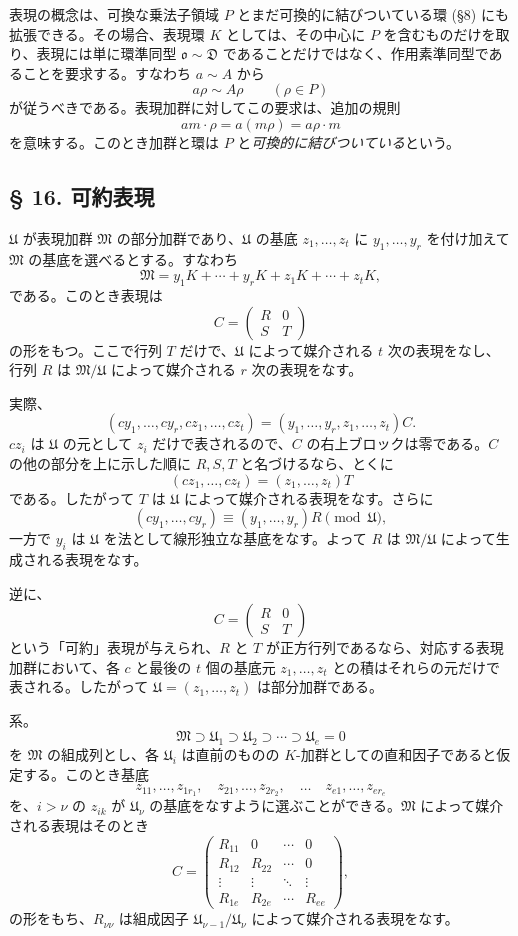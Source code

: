 \documentclass[11pt]{article}
\providecommand{\mM}{\mathfrak{M}}
\providecommand{\mU}{\mathfrak{U}}
\providecommand{\mo}{\mathfrak{o}}
\begin{document}
表現の概念は、可換な乗法子領域 $P$ とまだ可換的に結びついている環 (§8) にも拡張できる。その場合、表現環 $K$ としては、その中心に $P$ を含むものだけを取り、表現には単に環準同型 $\mo\sim\mathfrak D$ であることだけではなく、作用素準同型であることを要求する。すなわち $a\sim A$ から
\[
        a\rho\sim A\rho\qquad(\rho\in P)
\]
が従うべきである。表現加群に対してこの要求は、追加の規則
\[
        am\cdot\rho=a(m\rho)=a\rho\cdot m
\]
を意味する。このとき加群と環は $P$ と\emph{可換的に結びついている}という。

\subsection*{§ 16. 可約表現}

$\mU$ が表現加群 $\mM$ の部分加群であり、$\mU$ の基底 $z_1,\ldots,z_t$ に $y_1,\ldots,y_r$ を付け加えて $\mM$ の基底を選べるとする。すなわち
\[
        \mM=y_1K+\cdots+y_rK+z_1K+\cdots+z_tK,        \tag{2a}
\]
である。このとき表現は
\[
        C=\begin{pmatrix}R&0\\ S&T\end{pmatrix}
\]
の形をもつ。ここで行列 $T$ だけで、$\mU$ によって媒介される $t$ 次の表現をなし、行列 $R$ は $\mM/\mU$ によって媒介される $r$ 次の表現をなす。

実際、
\[
        (cy_1,\ldots,cy_r,cz_1,\ldots,cz_t)
        =(y_1,\ldots,y_r,z_1,\ldots,z_t)C.
\]
$cz_i$ は $\mU$ の元として $z_i$ だけで表されるので、$C$ の右上ブロックは零である。$C$ の他の部分を上に示した順に $R,S,T$ と名づけるなら、とくに
\[
        (cz_1,\ldots,cz_t)=(z_1,\ldots,z_t)T
\]
である。したがって $T$ は $\mU$ によって媒介される表現をなす。さらに
\[
        (cy_1,\ldots,cy_r)\equiv (y_1,\ldots,y_r)R \pmod{\mU},
\]
一方で $y_i$ は $\mU$ を法として線形独立な基底をなす。よって $R$ は $\mM/\mU$ によって生成される表現をなす。

逆に、
\[
        C=\begin{pmatrix}R&0\\ S&T\end{pmatrix}
\]
という「可約」表現が与えられ、$R$ と $T$ が正方行列であるなら、対応する表現加群において、各 $c$ と最後の $t$ 個の基底元 $z_1,\ldots,z_t$ との積はそれらの元だけで表される。したがって $\mU=(z_1,\ldots,z_t)$ は部分加群である。

系。 
\[
        \mM\supset \mU_1\supset \mU_2\supset\cdots\supset \mU_e=0
\]
を $\mM$ の組成列とし、各 $\mU_i$ は直前のものの $K$-加群としての直和因子であると仮定する。このとき基底
\[
        z_{11},\ldots,z_{1r_1},\quad
        z_{21},\ldots,z_{2r_2},\quad\ldots\quad
        z_{e1},\ldots,z_{er_e}
\]
を、$i>\nu$ の $z_{ik}$ が $\mU_\nu$ の基底をなすように選ぶことができる。$\mM$ によって媒介される表現はそのとき
\[
 C=\begin{pmatrix}
 R_{11}&0&\cdots&0\\
 R_{12}&R_{22}&\cdots&0\\
 \vdots&\vdots&\ddots&\vdots\\
 R_{1e}&R_{2e}&\cdots&R_{ee}
 \end{pmatrix},                                      \tag{2}
\]
の形をもち、$R_{\nu\nu}$ は組成因子 $\mU_{\nu-1}/\mU_\nu$ によって媒介される表現をなす。
\end{document}
